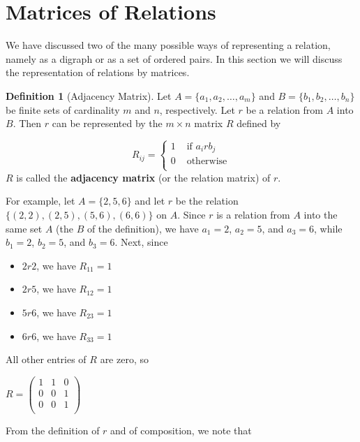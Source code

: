 \documentclass[10pt,]{book}
\newcommand{\terminology}[1]{\textbf{#1}}
\theoremstyle{plain}
\theoremstyle{definition}
\newtheorem{definition}[theorem]{Definition}
\theoremstyle{definition}
\theoremstyle{definition}
\theoremstyle{definition}
\begin{document}
\section[Matrices of Relations]{Matrices of Relations}\label{s-matrices-of-relations}
We have discussed two of the many possible ways of representing a relation, namely as a digraph or as a set of ordered pairs. In this section we will discuss the representation of relations by matrices.%
\begin{definition}[Adjacency Matrix]\label{def-adjacency-matrix}
Let \(A = \{a_1,a_2,\ldots , a_m\}\) and \(B= \{b_1,b_2,\ldots , b_n\}\) be finite sets of cardinality \(m\) and \(n\), respectively. Let \(r\) be a relation from \(A\) into \(B\). Then \(r\) can be represented by the \(m\times n\) matrix \(R\) defined by

\begin{equation*}R_{ij}= \left\{
		\begin{array}{cc}
		 1 & \textrm{   if } a_i r b_j \\
		 0 & \textrm{   otherwise}     \\
		\end{array}\right.
\end{equation*}
 \(R\) is called the \terminology{adjacency matrix} (or the relation matrix) of \(r\).%
\end{definition}
\par
For example, let \(A = \{2, 5, 6\}\) and let \(r\) be the relation \(\{(2, 2), (2, 5), (5, 6), (6, 6)\}\) on \(A\). Since \(r\) is a relation from \(A\) into the same set \(A\) (the \(B\) of the definition), we have \(a_1= 2\), \(a_2=5\), and \(a_3=6\), while \(b_1= 2\), \(b_2=5\), and \(b_3=6\). Next, since%
\par
\leavevmode%
\begin{itemize}[label=\textbullet]
\item{}\(2 r 2\), we have \(R_{11}= 1\)%
\item{}\(2 r 5\), we have \(R_{12}= 1\)%
\item{}\(5 r 6\), we have \(R_{23}= 1\) %
\item{}\(6 r 6\), we have \(R_{33}= 1\)%
\end{itemize}
%
\par
All other entries of \(R\) are zero, so

\(R =\left(
\begin{array}{ccc}
 1 & 1 & 0 \\
 0 & 0 & 1 \\
 0 & 0 & 1 \\
\end{array}
\right)\)
%
\par
From the definition of \(r\) and of composition, we note that
\end{document}
